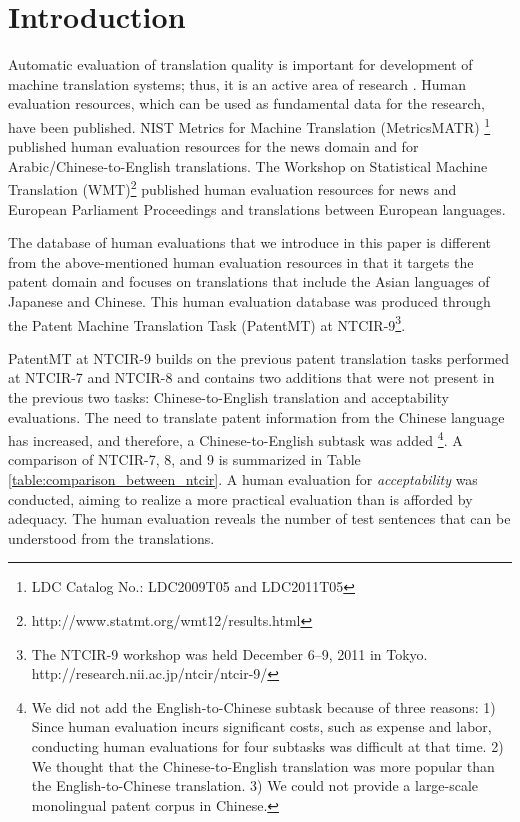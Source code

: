 \documentclass[english]{jnlp_1.4}
\begin{document}
\maketitle

\section{Introduction}

Automatic evaluation of translation quality is important for development of machine translation systems; 
thus, it is an active area of research \cite{papineni-EtAl:2002:ACL,lin-hovy:2003:NAACL,isozaki-EtAl:2010:EMNLP}. 
Human evaluation resources, which can be used as fundamental data for the research, have been published. NIST Metrics for Machine Translation (MetricsMATR)
\footnote{LDC Catalog No.: LDC2009T05 and LDC2011T05}
published human evaluation resources for the news domain and for Arabic/Chinese-to-English translations. 
The Workshop on Statistical Machine Translation (WMT)\footnote{http://www.statmt.org/wmt12/results.html} \cite{callisonburch-EtAl:2012:WMT} published human evaluation resources for news and European Parliament Proceedings and translations between European languages.

The database of human evaluations that we introduce in this paper is different from the above-mentioned human evaluation resources in that it targets the patent domain and focuses on translations that include the Asian languages of Japanese and Chinese.
This human evaluation database was produced through the Patent Machine Translation Task (PatentMT) at NTCIR-9\footnote{The NTCIR-9 workshop was held December 6--9, 2011 in Tokyo. http://research.nii.ac.jp/ntcir/ntcir-9/}. 


PatentMT at NTCIR-9 builds on the previous patent translation tasks performed at NTCIR-7 \cite{Fujii-EtAl:NTCIR7} and NTCIR-8 \cite{Fujii-EtAl:NTCIR8} and contains two additions that were not present in the previous two tasks: 
Chinese-to-English translation and acceptability evaluations. 
The need to translate patent information from the Chinese language has increased, and therefore, a Chinese-to-English subtask was added
\footnote{We did not add the English-to-Chinese subtask because of three reasons: 
1) Since human evaluation incurs significant costs, such as expense and labor, conducting human evaluations for four subtasks was difficult at that time. 
2) We thought that the Chinese-to-English translation was more popular than the English-to-Chinese translation. 
3) We could not provide a large-scale monolingual patent corpus in Chinese.
}. 
A comparison of NTCIR-7, 8, and 9 is summarized in Table \ref{table:comparison_between_ntcir}. 
A human evaluation for \textit{acceptability} was conducted, aiming to realize a more practical evaluation than is afforded by adequacy. 
The human evaluation reveals the number of test sentences that can be understood from the translations.
\end{document}
